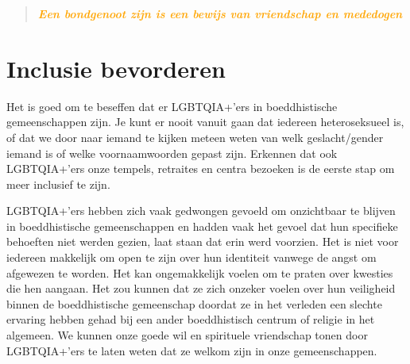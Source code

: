 \documentclass[12pt,openany]{book}
\begin{document}
\begin{figure}[h]
    \centering
\end{figure}

\begin{quote}
\centering
\doublespacing
\textit{\Large \textcolor{orange}{\textbf{Een bondgenoot zijn is een bewijs van vriendschap en mededogen}}}
\end{quote}

\section*{Inclusie bevorderen}

Het is goed om te beseffen dat er LGBTQIA+'ers in boeddhistische gemeenschappen zijn. Je kunt er nooit vanuit gaan dat iedereen heteroseksueel is, of dat we door naar iemand te kijken meteen weten van welk geslacht/gender iemand is of welke voornaamwoorden gepast zijn. Erkennen dat ook LGBTQIA+'ers onze tempels, retraites en centra bezoeken is de eerste stap om meer inclusief te zijn.

LGBTQIA+'ers hebben zich vaak gedwongen gevoeld om onzichtbaar te blijven in boeddhistische gemeenschappen en hadden vaak het gevoel dat hun specifieke behoeften niet werden gezien, laat staan dat erin werd voorzien.  Het is niet voor iedereen makkelijk om open te zijn over hun identiteit vanwege de angst om afgewezen te worden. Het kan ongemakkelijk voelen om te praten over kwesties die hen aangaan. Het zou kunnen dat ze zich onzeker voelen over hun veiligheid binnen de boeddhistische gemeenschap doordat ze in het verleden een slechte ervaring hebben gehad bij een ander boeddhistisch centrum of religie in het algemeen. We kunnen onze goede wil en spirituele vriendschap tonen door LGBTQIA+'ers te laten weten dat ze welkom zijn in onze gemeenschappen.
\end{document}
